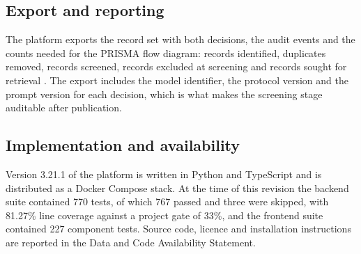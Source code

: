 \subsection{Export and reporting}

The platform exports the record set with both decisions, the audit events and
the counts needed for the PRISMA flow diagram: records identified, duplicates
removed, records screened, records excluded at screening and records sought for
retrieval \autocite{Page_2021}. The export includes the model identifier, the
protocol version and the prompt version for each decision, which is what makes
the screening stage auditable after publication.

\subsection{Implementation and availability}

Version 3.21.1 of the platform is written in Python and TypeScript and is
distributed as a Docker Compose stack. At the time of this revision the backend
suite contained 770 tests, of which 767 passed and three were skipped, with
81.27\% line coverage against a project gate of 33\%, and the frontend suite
contained 227 component tests. Source code, licence and installation
instructions are reported in the Data and Code Availability Statement.
